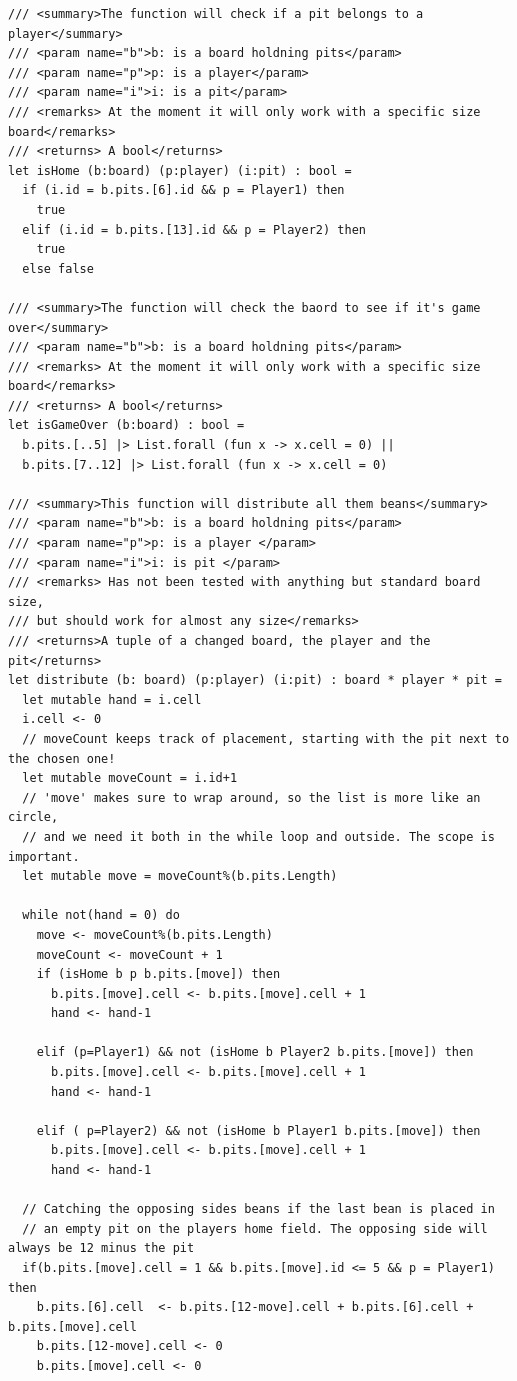 \documentclass{article}
\begin{document}
\begin{lstlisting}[frame=single]
/// <summary>The function will check if a pit belongs to a player</summary>
/// <param name="b">b: is a board holdning pits</param>
/// <param name="p">p: is a player</param>
/// <param name="i">i: is a pit</param>
/// <remarks> At the moment it will only work with a specific size board</remarks>
/// <returns> A bool</returns>   
let isHome (b:board) (p:player) (i:pit) : bool =
  if (i.id = b.pits.[6].id && p = Player1) then 
    true
  elif (i.id = b.pits.[13].id && p = Player2) then
    true
  else false

/// <summary>The function will check the baord to see if it's game over</summary>
/// <param name="b">b: is a board holdning pits</param>
/// <remarks> At the moment it will only work with a specific size board</remarks>
/// <returns> A bool</returns> 
let isGameOver (b:board) : bool =
  b.pits.[..5] |> List.forall (fun x -> x.cell = 0) || 
  b.pits.[7..12] |> List.forall (fun x -> x.cell = 0)

/// <summary>This function will distribute all them beans</summary>
/// <param name="b">b: is a board holdning pits</param>
/// <param name="p">p: is a player </param>
/// <param name="i">i: is pit </param>
/// <remarks> Has not been tested with anything but standard board size, 
/// but should work for almost any size</remarks>
/// <returns>A tuple of a changed board, the player and the pit</returns>
let distribute (b: board) (p:player) (i:pit) : board * player * pit =
  let mutable hand = i.cell
  i.cell <- 0
  // moveCount keeps track of placement, starting with the pit next to the chosen one!
  let mutable moveCount = i.id+1
  // 'move' makes sure to wrap around, so the list is more like an circle, 
  // and we need it both in the while loop and outside. The scope is important.
  let mutable move = moveCount%(b.pits.Length)

  while not(hand = 0) do
    move <- moveCount%(b.pits.Length)
    moveCount <- moveCount + 1
    if (isHome b p b.pits.[move]) then
      b.pits.[move].cell <- b.pits.[move].cell + 1
      hand <- hand-1

    elif (p=Player1) && not (isHome b Player2 b.pits.[move]) then
      b.pits.[move].cell <- b.pits.[move].cell + 1
      hand <- hand-1

    elif ( p=Player2) && not (isHome b Player1 b.pits.[move]) then
      b.pits.[move].cell <- b.pits.[move].cell + 1
      hand <- hand-1
  
  // Catching the opposing sides beans if the last bean is placed in 
  // an empty pit on the players home field. The opposing side will always be 12 minus the pit
  if(b.pits.[move].cell = 1 && b.pits.[move].id <= 5 && p = Player1) then
    b.pits.[6].cell  <- b.pits.[12-move].cell + b.pits.[6].cell + b.pits.[move].cell
    b.pits.[12-move].cell <- 0
    b.pits.[move].cell <- 0


\end{lstlisting}
\end{document}

